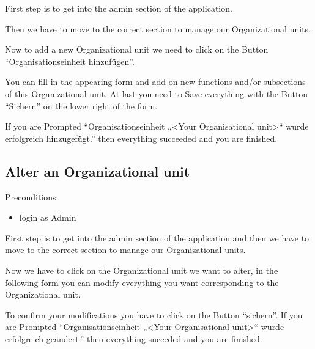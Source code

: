\documentclass[letterpaper,10pt,english]{sphinxmanual}
\begin{document}
First step is to get into the admin section of the application.

\noindent{}

Then we have to move to the correct section to manage our Organizational units.

\noindent{}

Now to add a new Organizational unit we need to click on the Button
“Organisationseinheit hinzufügen”.

\noindent{}

You can fill in the appearing form and add on new functions and/or
subsections of this Organizational unit. At last you need to Save everything
with the Button “Sichern” on the lower right of the form.

\noindent{}

If you are Prompted
“Organisationseinheit „\textless{}Your Organisational unit\textgreater{}“ wurde erfolgreich hinzugefügt.”
then everything succeeded and you are finished.


\subsection{Alter an Organizational unit}
\label{\detokenize{masterUserDoc:alter-an-organizational-unit}}
Pre\sphinxhyphen{}conditions:
\begin{itemize}
\item {} 
login as Admin

\end{itemize}

First step is to get into the admin section of the application and
then we have to move to the correct section to manage our Organizational units.

\noindent{}

Now we have to click on the Organizational unit we want to alter, in the
following form you can modify everything you want corresponding to the
Organizational unit.

\noindent{}

To confirm your modifications you have to click on the Button “sichern”.
If you are Prompted
“Organisationseinheit „\textless{}Your Organisational unit\textgreater{}“ wurde erfolgreich geändert.”
then everything succeded and you are finished.
\end{document}
